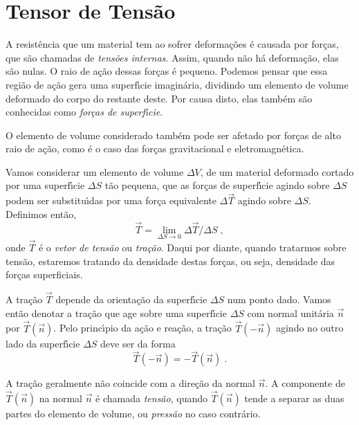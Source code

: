 \section{Tensor de Tens\~ao}
\label{tensor_tens}

A resist\^encia que um material tem ao sofrer deforma\c{c}\~oes
\'e causada por for\c{c}as, que s\~ao chamadas de {\it
tens\~oes internas}. Assim, quando n\~ao h\'a deforma\c{c}\~ao,
elas s\~ao nulas. O raio de a\c{c}\~ao dessas for\c{c}as \'e
pequeno. Podemos pensar que essa regi\~ao de a\c{c}\~ao gera uma
superf\'{\i}cie imagin\'aria, dividindo um elemento de volume
deformado do corpo do restante deste. Por causa disto, elas
tamb\'em s\~ao conhecidas como {\it for\c{c}as de
superf\'{\i}cie}.

O elemento de volume considerado  tamb\'em pode ser afetado por
for\c{c}as de alto raio de a\c{c}\~ao, como \'e o caso das
for\c{c}as gravitacional e eletromagn\'etica.

Vamos considerar um elemento de volume $\Delta V$, de um material
deformado cortado por uma superf\'{\i}cie $\Delta S$ t\~ao
pequena, que as for\c{c}as de superf\'{\i}cie agindo sobre $\Delta
S$ podem ser substitu\'{\i}das por uma for\c{c}a equivalente
$\Delta \vec{T}$ agindo sobre $\Delta S$. Definimos ent\~ao,
\begin{equation}
\vec{T} = \lim_{\Delta S \rightarrow 0} {\Delta \vec{T} / \Delta
S}\;, \end{equation} onde $\vec{T}$ \'e o {\it vetor de tens\~ao}
ou {\it tra\c{c}\~ao}. Daqui por diante, quando tratarmos sobre
tens\~ao, estaremos tratando da densidade destas for\c{c}as, ou
seja, densidade das for\c{c}as superficiais.

A tra\c{c}\~ao $\vec{T}$ depende da orienta\c{c}\~ao da
superf\'{\i}cie $\Delta S$ num ponto dado. Vamos ent\~ao denotar a
tra\c{c}\~ao que age sobre uma superf\'{\i}cie $\Delta S$ com
normal unit\'aria $\vec{n}$ por $\vec{T}(\vec{n})$. Pelo
princ\'{\i}pio da a\c{c}\~ao e rea\c{c}\~ao, a tra\c{c}\~ao
$\vec{T}(-\vec{n})$ agindo no outro lado da superf\'{\i}cie
$\Delta S$ deve ser da forma
\begin{equation}
\vec{T}(-\vec{n})=-\vec{T}(\vec{n})\;.
\end{equation}

A tra\c{c}\~ao geralmente n\~ao coincide com a dire\c{c}\~ao da
normal $\vec{n}$. A componente de $\vec{T}(\vec{n})$ na normal
$\vec{n}$ \'e chamada {\it tens\~ao}, quando $\vec{T}(\vec{n})$
tende a separar as duas partes do elemento de volume, ou {\it
press\~ao} no caso contr\'ario.

